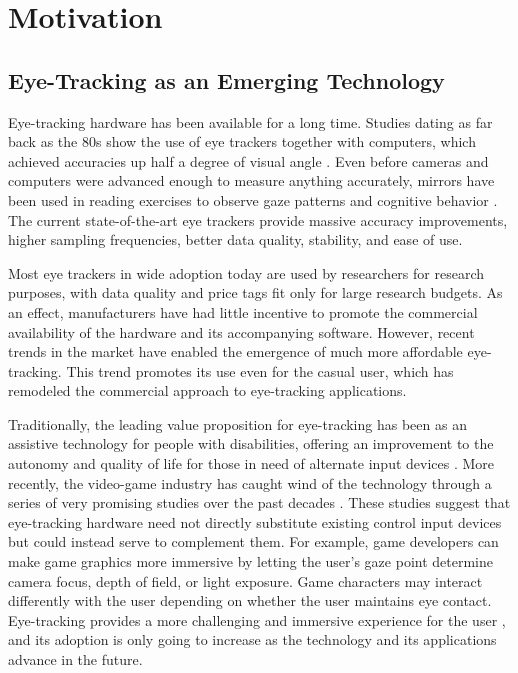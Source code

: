 \section{Motivation} \label{sec:intro/motivation}

\subsection{Eye-Tracking as an Emerging Technology} \label{sec:intro/motivation/eye_tracking}

Eye-tracking hardware has been available for a long time. Studies dating as far back as the 80s show the use of eye trackers together with computers, which achieved accuracies up half a degree of visual angle \cite{colin1986}. Even before cameras and computers were advanced enough to measure anything accurately, mirrors have been used in reading exercises to observe gaze patterns and cognitive behavior \cite{vanGog2013}. The current state-of-the-art eye trackers provide massive accuracy improvements, higher sampling frequencies, better data quality, stability, and ease of use.

Most eye trackers in wide adoption today are used by researchers for research purposes, with data quality and price tags fit only for large research budgets. As an effect, manufacturers have had little incentive to promote the commercial availability of the hardware and its accompanying software. However, recent trends in the market have enabled the emergence of much more affordable eye-tracking. 
This trend promotes its use even for the casual user, which has remodeled the commercial approach to eye-tracking applications.

Traditionally, the leading value proposition for eye-tracking has been as an assistive technology for people with disabilities, offering an improvement to the autonomy and quality of life for those in need of alternate input devices \cite{barry1994, corno2002}. More recently, the video-game industry has caught wind of the technology through a series of very promising studies over the past decades \cite{leyba2004, smith2006, tobii2017}. These studies suggest that eye-tracking hardware need not directly substitute existing control input devices but could instead serve to complement them. For example, game developers can make game graphics more immersive by letting the user's gaze point determine camera focus, depth of field, or light exposure. Game characters may interact differently with the user depending on whether the user maintains eye contact. Eye-tracking provides a more challenging and immersive experience for the user \cite{antunes2018}, and its adoption is only going to increase as the technology and its applications advance in the future.


